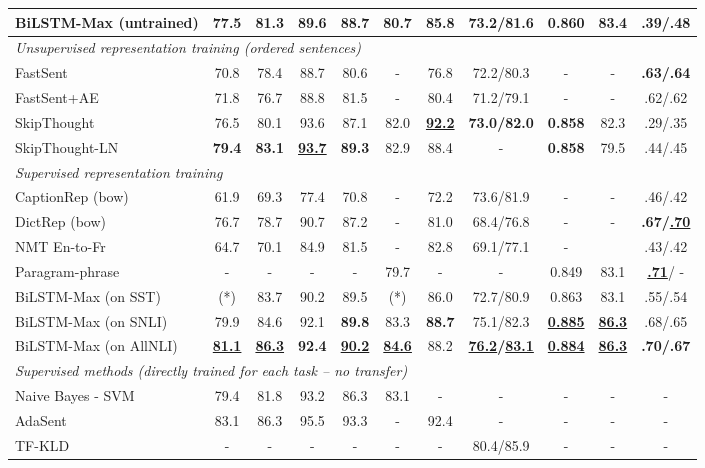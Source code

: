 \documentclass[11pt,letterpaper]{article}
\begin{document}
\begin{table*}[h!]
{\begin{tabular}{@{}l@{\,}|cccc@{\,\,}c@{\,\,}ccccc@{}}
BiLSTM-Max (untrained)  & 77.5 & \bf 81.3 & 89.6 & \bf 88.7 & 80.7 & \bf 85.8 & 73.2/81.6 & \bf 0.860 & 83.4 & .39/.48 \\
\hline
\hline
\multicolumn{7}{l}{\it Unsupervised representation training (ordered sentences)} &&&& \\
\hline
FastSent & 70.8 & 78.4 & 88.7 & 80.6 & - & 76.8 & 72.2/80.3 & - & - & \bf .63/.64 \\
FastSent+AE & 71.8 & 76.7 & 88.8 & 81.5 & - & 80.4 & 71.2/79.1 & - & - & .62/.62 \\
SkipThought &   76.5 & 80.1 & 93.6 & 87.1 & 82.0 & \bf \underline{92.2} & \bf 73.0/82.0 & \bf 0.858 & 82.3 & .29/.35 \\
SkipThought-LN & \bf 79.4 & \bf 83.1 & \bf \underline{93.7} & \bf 89.3 & 82.9 & 88.4 & - & \bf 0.858 & 79.5 & .44/.45 \\
\hline
\hline
\multicolumn{5}{l}{\it Supervised representation training} &&&&&& \\
\hline
CaptionRep (bow) & 61.9 &  69.3 & 77.4 &  70.8 &  - & 72.2 & 73.6/81.9 & - &  - & .46/.42 \\
DictRep (bow)  & 76.7 & 78.7 & 90.7 & 87.2 & - & 81.0 & 68.4/76.8 & - & - &  \bf .67/\underline{.70} \\
NMT En-to-Fr &  64.7 &  70.1 & 84.9 &  81.5 &  - & 82.8 & 69.1/77.1 & - &   & .43/.42 \\
Paragram-phrase  & - & - & - & - & 79.7 & - & - & 0.849 & 83.1 & \multicolumn{1}{c}{\underline{\textbf{.71}}/ -} \\
\hline
BiLSTM-Max (on SST) & (*) & 83.7 & 90.2 & 89.5 & (*) & 86.0 & 72.7/80.9 & 0.863 & 83.1 & .55/.54  \\
BiLSTM-Max (on SNLI) &  79.9 & 84.6 & 92.1 & \bf 89.8 & 83.3 & \bf 88.7 & 75.1/82.3 & \bf \underline{0.885} & \bf \underline{86.3} & .68/.65 \\
BiLSTM-Max (on AllNLI) &  \bf \underline{81.1} & \bf \underline{86.3} & \bf 92.4 & \bf \underline{90.2} & \bf \underline{84.6} & 88.2 & \bf \underline{76.2}/\underline{83.1} & \bf \underline{0.884} & \bf \underline{86.3} & \bf .70/.67 \\
\hline
\hline
\multicolumn{7}{l}{\it Supervised methods (directly trained for each task -- no transfer)} && \\
\hline
Naive Bayes - SVM  & 79.4 & 81.8 & 93.2 & 86.3 &  83.1 & - & - & - & - & - \\
AdaSent  &  83.1 & 86.3 & 95.5 & 93.3 & - & 92.4 & - & - & - & - \\
TF-KLD  &  - & - & - & - & - & - & 80.4/85.9 & - & - & - \\

\end{tabular}}
\end{table*}
\end{document}
